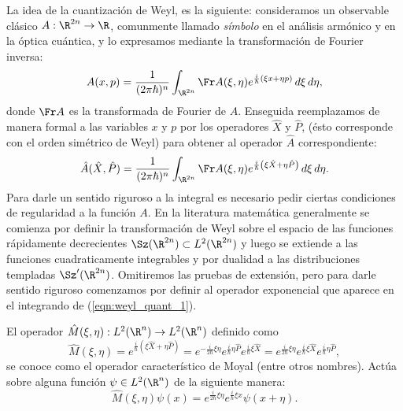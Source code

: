 La idea de la cuantización de Weyl, es la siguiente:
  consideramos un observable clásico $A : \R^{2n} \to \R$,
  comunmente llamado \textit{símbolo} en el análisis
  armónico y en la óptica cuántica, y lo expresamos mediante
  la transformación de Fourier inversa:
  \begin{equation}
    A(x,p)
    = \frac{1}{(2\pi\hbar)^{n}} \int_{\R^{2n}} \Fr A(\xi,
    \eta) e^{\frac{i}{\hbar} \left( \xi x + \eta p\right) }
    \, d\xi \, d\eta,
  \end{equation}
  donde $\Fr A$ es la transformada de Fourier de $A$.
  Enseguida reemplazamos de manera formal a las variables
  $x$ y $p$ por los operadores $\hat{X}$ y $\hat{P}$, (ésto
  corresponde con el orden simétrico de Weyl) para obtener
  al operador $\hat{A}$ correspondiente:
  \begin{equation}
    \label{eqn:weyl_quant_1}
    \hat{A}(\hat{X},\hat{P})
    = \frac{1}{(2\pi\hbar)^{n}} \int_{\R^{2n}} \Fr
    A(\xi,\eta) e^{\frac{i}{\hbar} \left( \xi \hat{X} + \eta
    \hat{P}\right) } \, d\xi \, d\eta.
  \end{equation}
  Para darle un sentido riguroso a la integral es necesario
  pedir ciertas condiciones de regularidad a la función $A$.
  En la literatura matemática generalmente se comienza por
  definir la transformación de Weyl sobre el espacio de las
  funciones rápidamente decrecientes $\Sz(\R^{2n}) \subset
  L^2(\R^{2n})$ y luego se extiende a las funciones
  cuadraticamente integrables y por dualidad a las
  distribuciones templadas $\Sz'(\R^{2n})$. Omitiremos las
  pruebas de extensión, pero para darle sentido riguroso
  comenzamos por definir al operador exponencial que aparece
  en el integrando de (\ref{eqn:weyl_quant_1}).
  \begin{definition}
    El operador $\hat{M}(\xi, \eta) : L^2(\R^{n}) \to
    L^2(\R^{n})$ definido como
    \begin{equation*}
      \hat{M}(\xi,\eta)
      = e^{\frac{i}{\hbar} \left( \xi \hat{X} + \eta \hat{P}
      \right) }
      = e^{-\frac{i}{2\hbar} \xi \eta} e^{\frac{i}{\hbar}
      \eta \hat{P}} e^{\frac{i}{\hbar} \xi \hat{X}}
      = e^{\frac{i}{2\hbar} \xi \eta} e^{\frac{i}{\hbar}
      \xi \hat{X}} e^{\frac{i}{\hbar} \eta \hat{P}},
    \end{equation*} 
    se conoce como el operador característico de Moyal
    (entre otros nombres). Actúa sobre alguna función $\psi
    \in L^2(\R^{n})$ de la siguiente manera:
    \begin{equation}
      \hat{M}(\xi,\eta)\psi(x)
      = e^{\frac{i}{2\hbar} \xi\eta} e^{\frac{i}{\hbar} \xi
      x} \psi(x + \eta).
    \end{equation}
  \end{definition}

